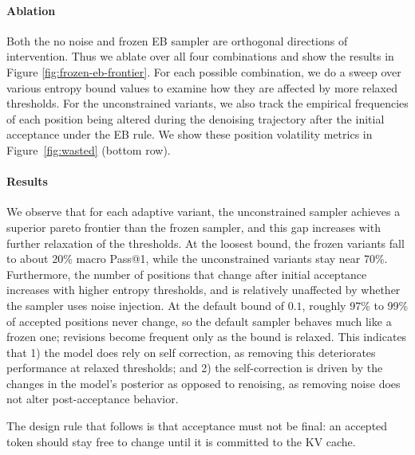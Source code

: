 \paragraph{Ablation}
Both the no noise and frozen EB sampler are orthogonal directions of intervention. Thus we ablate over all four combinations and show the results in Figure \ref{fig:frozen-eb-frontier}.
For each possible combination, we do a sweep over various entropy bound values to examine how they are affected by more relaxed thresholds. 
For the unconstrained variants, we also track the empirical frequencies of each position being altered during the denoising trajectory after the initial acceptance under the EB rule.
We show these position volatility metrics in Figure~\ref{fig:wasted} (bottom row).

\paragraph{Results}
We observe that for each adaptive variant, the unconstrained sampler achieves a superior pareto frontier than the frozen sampler, and this gap increases with further relaxation of the thresholds.
At the loosest bound, the frozen variants fall to about 20\% macro Pass@1, while the unconstrained variants stay near 70\%.
Furthermore, the number of positions that change after initial acceptance increases with higher entropy thresholds, and is relatively unaffected by whether the sampler uses noise injection.
At the default bound of $0.1$, roughly 97\% to 99\% of accepted positions never change, so the default sampler behaves much like a frozen one; revisions become frequent only as the bound is relaxed.
This indicates that 1) the model does rely on self correction, as removing this deteriorates performance at relaxed thresholds; and 2) the self-correction is driven by the changes in the model's posterior as opposed to renoising, as removing noise does not alter post-acceptance behavior.

The design rule that follows is that acceptance must not be final: an accepted token should stay free to change until it is committed to the KV cache.

